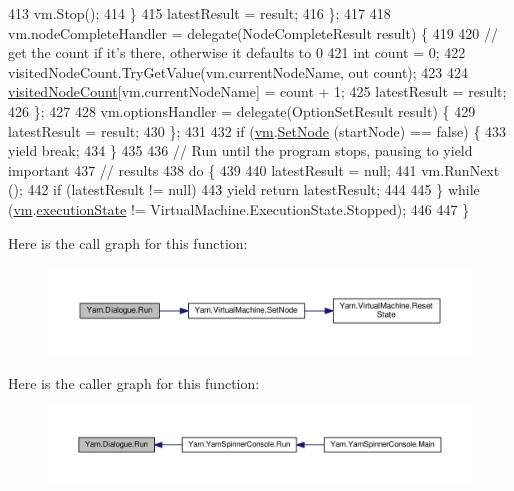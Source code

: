 \begin{DoxyCode}
413                     vm.Stop();
414                 \}
415                 latestResult = result;
416             \};
417 
418             vm.nodeCompleteHandler = delegate(NodeCompleteResult result) \{
419 
420                 \textcolor{comment}{// get the count if it's there, otherwise it defaults to 0}
421                 \textcolor{keywordtype}{int} count = 0;
422                 visitedNodeCount.TryGetValue(vm.currentNodeName, out count);
423 
424                 \hyperlink{a00094_aae9e64354066a1e2fa130629959d772b}{visitedNodeCount}[vm.currentNodeName] = count + 1;
425                 latestResult = result;
426             \};
427 
428             vm.optionsHandler = delegate(OptionSetResult result) \{
429                 latestResult = result;
430             \};
431 
432             \textcolor{keywordflow}{if} (\hyperlink{a00094_a8c1319357a9df6cff051328fb33224c7}{vm}.\hyperlink{a00164_a6364593ea1115d65e34b343422cfbbbd}{SetNode} (startNode) == \textcolor{keyword}{false}) \{
433                 yield \textcolor{keywordflow}{break};
434             \}
435 
436             \textcolor{comment}{// Run until the program stops, pausing to yield important}
437             \textcolor{comment}{// results}
438             \textcolor{keywordflow}{do} \{
439 
440                 latestResult = null;
441                 vm.RunNext ();
442                 \textcolor{keywordflow}{if} (latestResult != null)
443                     yield \textcolor{keywordflow}{return} latestResult;
444 
445             \} \textcolor{keywordflow}{while} (\hyperlink{a00094_a8c1319357a9df6cff051328fb33224c7}{vm}.\hyperlink{a00164_a66491da06023dabfb63d09e6ccbba74f}{executionState} != VirtualMachine.ExecutionState.Stopped);
446 
447         \}
\end{DoxyCode}


Here is the call graph for this function\-:
\nopagebreak
\begin{figure}[H]
\begin{center}
\leavevmode
\includegraphics[width=350pt]{a00094_aead84ee50cb113ca45724894290ce9c2_cgraph}
\end{center}
\end{figure}




Here is the caller graph for this function\-:
\nopagebreak
\begin{figure}[H]
\begin{center}
\leavevmode
\includegraphics[width=350pt]{a00094_aead84ee50cb113ca45724894290ce9c2_icgraph}
\end{center}
\end{figure}


